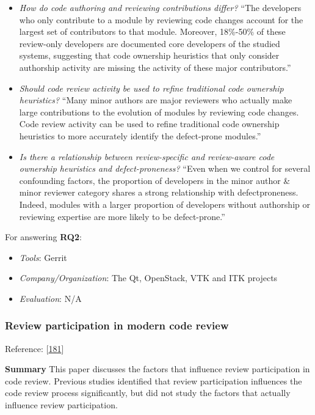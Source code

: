 \documentclass[]{book}
\providecommand{\tightlist}{%
  \setlength{\itemsep}{0pt}\setlength{\parskip}{0pt}}
\begin{document}
\begin{itemize}
\item
  \emph{How do code authoring and reviewing contributions differ?} ``The
  developers who only contribute to a module by reviewing code changes
  account for the largest set of contributors to that module. Moreover,
  18\%-50\% of these review-only developers are documented core
  developers of the studied systems, suggesting that code ownership
  heuristics that only consider authorship activity are missing the
  activity of these major contributors.''
\item
  \emph{Should code review activity be used to refine traditional code
  ownership heuristics?} ``Many minor authors are major reviewers who
  actually make large contributions to the evolution of modules by
  reviewing code changes. Code review activity can be used to refine
  traditional code ownership heuristics to more accurately identify the
  defect-prone modules.''
\item
  \emph{Is there a relationship between review-specific and review-aware
  code ownership heuristics and defect-proneness?} ``Even when we
  control for several confounding factors, the proportion of developers
  in the minor author \& minor reviewer category shares a strong
  relationship with defectproneness. Indeed, modules with a larger
  proportion of developers without authorship or reviewing expertise are
  more likely to be defect-prone.''
\end{itemize}

For answering \textbf{RQ2}:

\begin{itemize}
\tightlist
\item
  \emph{Tools}: Gerrit
\item
  \emph{Company/Organization}: The Qt, OpenStack, VTK and ITK projects
\item
  \emph{Evaluation}: N/A
\end{itemize}

\subsubsection{Review participation in modern code
review}\label{review-participation-in-modern-code-review}

Reference: {[}\protect\hyperlink{ref-thongtanunam2017review}{181}{]}

\textbf{Summary} This paper discusses the factors that influence review
participation in code review. Previous studies identified that review
participation influences the code review process significantly, but did
not study the factors that actually influence review participation.
\end{document}
